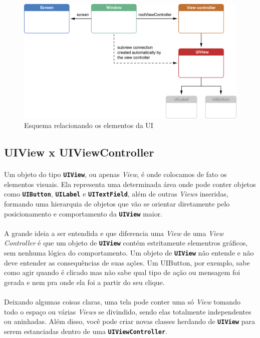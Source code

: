 \documentclass[a4paper,12pt,brazil,doubleside]{book}
\begin{document}
\begin{figure}[h]
  \centering
  \includegraphics[totalheight=0.35\textheight]{../figuras/ios/apple_window_view_controller_screen.png}
  \caption{Esquema relacionando os elementos da UI}
  \label{fig:a}
\end{figure}

\bigskip

\subsection{UIView x UIViewController}

\paragraph{}Um objeto do tipo \texttt{\textbf{UIView}}, ou apenas \emph{View}, é onde colocamos de fato os elementos visuais. Ela representa uma determinada área onde pode conter objetos como \texttt{\textbf{UIButton}}, \texttt{\textbf{UILabel}} e \texttt{\textbf{UITextField}}, além de outras \emph{Views} inseridas, formando uma hierarquia de objetos que vão se orientar diretamente pelo posicionamento e comportamento da \texttt{\textbf{UIView}} maior.
\paragraph{}A grande ideia a ser entendida e que diferencia uma \emph{View} de uma \emph{View Controller} é que um objeto de \texttt{\textbf{UIView}} contém estritamente elementros gráficos, sem nenhuma lógica do comportamento. Um objeto de \texttt{\textbf{UIView}} não entende e não deve entender as consequências de suas ações. Um UIButton, por exemplo, sabe como agir quando é clicado mas não sabe qual tipo de ação ou mensagem foi gerada e nem pra onde ela foi a partir do seu clique.
\paragraph{}Deixando algumas coisas claras, uma tela pode conter uma só \emph{View} tomando todo o espaço ou várias \emph{Views} se divindido, sendo elas totalmente independentes ou aninhadas. Além disso, você pode criar novas classes herdando de \texttt{\textbf{UIView}} para serem estanciadas dentro de uma \texttt{\textbf{UIViewController}}.\\
\end{document}
